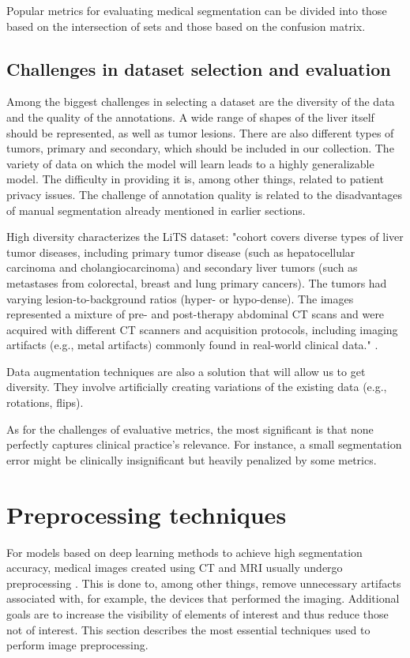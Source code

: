 Popular metrics for evaluating medical segmentation can be divided into those based on the intersection of sets and those based on the confusion matrix.




\subsection{Challenges in dataset selection and evaluation}

Among the biggest challenges in selecting a dataset are the diversity of the data and the quality of the annotations. A wide range of shapes of the liver itself should be represented, as well as tumor lesions. There are also different types of tumors, primary and secondary, which should be included in our collection. The variety of data on which the model will learn leads to a highly generalizable model. The difficulty in providing it is, among other things, related to patient privacy issues. The challenge of annotation quality is related to the disadvantages of manual segmentation already mentioned in earlier sections.


High diversity characterizes the LiTS dataset:  "cohort covers diverse types of liver tumor diseases, including primary tumor disease (such as hepatocellular carcinoma and cholangiocarcinoma) and secondary liver tumors (such as metastases from colorectal, breast and lung primary cancers). The tumors had varying lesion-to-background ratios (hyper- or hypo-dense). The images represented a mixture of pre- and post-therapy abdominal CT scans and were acquired with different CT scanners and acquisition protocols, including imaging artifacts (e.g., metal artifacts) commonly found in real-world clinical data." \cite{bilic_liver_2023}. 

Data augmentation techniques are also a solution that will allow us to get diversity. They involve artificially creating variations of the existing data (e.g., rotations, flips).

As for the challenges of evaluative metrics, the most significant is that none perfectly captures clinical practice's relevance. For instance, a small segmentation error might be clinically insignificant but heavily penalized by some metrics.

\section{Preprocessing techniques}

For models based on deep learning methods to achieve high segmentation accuracy, medical images created using CT and MRI usually undergo preprocessing \cite{islam_evaluation_2021}. This is done to, among other things, remove unnecessary artifacts associated with, for example, the devices that performed the imaging. Additional goals are to increase the visibility of elements of interest and thus reduce those not of interest. This section describes the most essential techniques used to perform image preprocessing.


